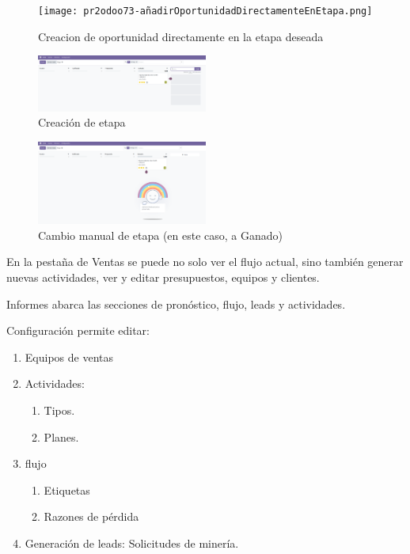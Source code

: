 \documentclass[a4paper,12pt]{article}
\begin{document}
\begin{figure}[h!]
    \centering
    \texttt{[image: pr2odoo73-añadirOportunidadDirectamenteEnEtapa.png]}
    \caption{Creacion de oportunidad directamente en la etapa deseada}
\end{figure}
\FloatBarrier

\begin{figure}[h!]
    \centering
    \includegraphics[width=0.5\textwidth]{pr2odoo74-crearEtapa.png}
    \caption{Creación de etapa}
\end{figure}
\FloatBarrier

\begin{figure}[h!]
    \centering
    \includegraphics[width=0.5\textwidth]{pr2odoo75-cambioManualDeEtapa.png}
    \caption{Cambio manual de etapa (en este caso, a Ganado)}
\end{figure}
\FloatBarrier

En la pestaña de Ventas se puede no solo ver el flujo actual, sino también generar nuevas actividades, ver y editar presupuestos, equipos y clientes.

Informes abarca las secciones de pronóstico, flujo, leads y actividades.

Configuración permite editar:
\begin{enumerate}
    \item Equipos de ventas
    \item Actividades:
    \begin{enumerate}
        \item Tipos.
        \item Planes.
    \end{enumerate}
    \item flujo
    \begin{enumerate}
        \item Etiquetas
        \item Razones de pérdida
    \end{enumerate}
    \item Generación de leads: Solicitudes de minería.
\end{enumerate}
\end{document}
